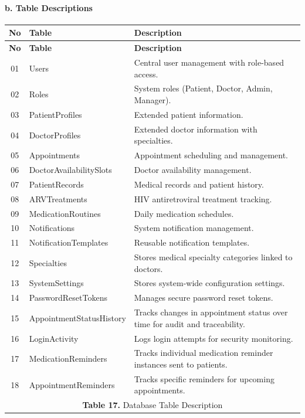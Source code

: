 \documentclass[12pt,a4paper]{article}
\begin{document}
\paragraph{b. Table Descriptions}
\renewcommand{\arraystretch}{1.5}
\begin{longtable}{|c|p{4cm}|p{9cm}|}
\hline
\textbf{No} & \textbf{Table} & \textbf{Description} \\
\hline
\endfirsthead

\hline
\textbf{No} & \textbf{Table} & \textbf{Description} \\
\hline
\endhead

01 & Users & Central user management with role-based access. \\
\hline
02 & Roles & System roles (Patient, Doctor, Admin, Manager). \\
\hline
03 & PatientProfiles & Extended patient information. \\
\hline
04 & DoctorProfiles & Extended doctor information with specialties. \\
\hline
05 & Appointments & Appointment scheduling and management. \\
\hline
06 & DoctorAvailabilitySlots & Doctor availability management. \\
\hline
07 & PatientRecords & Medical records and patient history. \\
\hline
08 & ARVTreatments & HIV antiretroviral treatment tracking. \\
\hline
09 & MedicationRoutines & Daily medication schedules. \\
\hline
10 & Notifications & System notification management. \\
\hline
11 & NotificationTemplates & Reusable notification templates. \\
\hline
12 & Specialties & Stores medical specialty categories linked to doctors. \\
\hline
13 & SystemSettings & Stores system-wide configuration settings. \\
\hline
14 & PasswordResetTokens & Manages secure password reset tokens. \\
\hline
15 & AppointmentStatusHistory & Tracks changes in appointment status over time for audit and traceability. \\
\hline
16 & LoginActivity & Logs login attempts for security monitoring. \\
\hline
17 & MedicationReminders & Tracks individual medication reminder instances sent to patients. \\
\hline
18 & AppointmentReminders & Tracks specific reminders for upcoming appointments. \\
\hline
\multicolumn{3}{|c|}{\textbf{Table 17.} Database Table Description} \\
\hline
\end{longtable}
\end{document}
